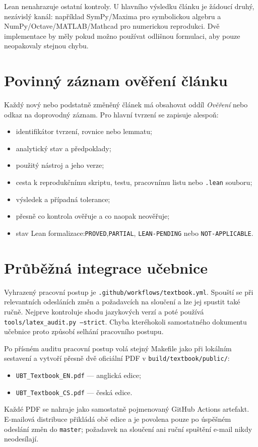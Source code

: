 Lean nenahrazuje ostatní kontroly. U hlavního výsledku článku je žádoucí druhý,
nezávislý kanál: například SymPy/Maxima pro symbolickou algebru a
NumPy/Octave/MATLAB/Mathcad pro numerickou reprodukci. Dvě implementace by měly
pokud možno používat odlišnou formulaci, aby pouze neopakovaly stejnou chybu.

\section{Povinný záznam ověření článku}
Každý nový nebo podstatně změněný článek má obsahovat oddíl \emph{Ověření}
nebo odkaz na doprovodný záznam. Pro hlavní tvrzení se zapisuje alespoň:
\begin{itemize}
 \item identifikátor tvrzení, rovnice nebo lemmatu;
 \item analytický stav a předpoklady;
 \item použitý nástroj a jeho verze;
 \item cesta k reprodukčnímu skriptu, testu, pracovnímu listu nebo \texttt{.lean}
       souboru;
 \item výsledek a případná tolerance;
 \item přesně co kontrola ověřuje a co naopak neověřuje;
 \item stav Lean formalizace:\texttt{PROVED},\texttt{PARTIAL},
       \texttt{LEAN-PENDING} nebo \texttt{NOT-APPLICABLE}.
\end{itemize}

\section{Průběžná integrace učebnice}
Vyhrazený pracovní postup je \texttt{.github/workflows/textbook.yml}. Spouští
se při relevantních odesláních změn a požadavcích na sloučení a lze jej spustit
také ručně. Nejprve
kontroluje shodu jazykových verzí a poté používá
\texttt{tools/latex\_audit.py --strict}. Chyba kteréhokoli samostatného
dokumentu učebnice proto způsobí selhání pracovního postupu.

Po přísném auditu pracovní postup volá stejný Makefile jako při lokálním sestavení a
vytvoří přesně dvě oficiální PDF v \texttt{build/textbook/public/}:
\begin{itemize}
 \item \texttt{UBT\_Textbook\_EN.pdf} --- anglická edice;
 \item \texttt{UBT\_Textbook\_CS.pdf} --- česká edice.
\end{itemize}
Každé PDF se nahraje jako samostatně pojmenovaný GitHub Actions artefakt.
E-mailová distribuce přikládá obě edice a je povolena pouze po úspěšném
odeslání změn do \texttt{master}; požadavek na sloučení ani ruční spuštění
e-mail nikdy neodesílají.

